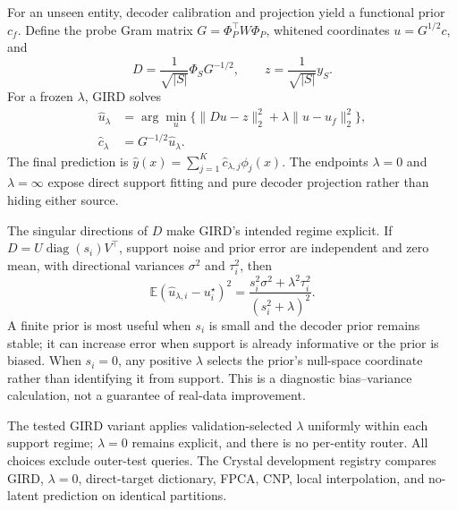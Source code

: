 For an unseen entity, decoder calibration and projection yield a functional
prior $c_f$.  Define the probe Gram matrix
$G=\Phi_P^\top W\Phi_P$, whitened coordinates $u=G^{1/2}c$, and
\begin{equation}
  D=\frac{1}{\sqrt{|S|}}\Phi_SG^{-1/2},\qquad
  z=\frac{1}{\sqrt{|S|}}y_S.
\end{equation}
For a frozen $\lambda$, GIRD solves
\begin{equation}
  \begin{aligned}
    \hat u_\lambda
    &=\arg\min_u
      \bigl\{\|Du-z\|_2^2
      +\lambda\|u-u_f\|_2^2\bigr\},\\
    \hat c_\lambda&=G^{-1/2}\hat u_\lambda.
  \end{aligned}
  \label{eq:gird}
\end{equation}
The final prediction is
$\hat y(x)=\sum_{j=1}^{K}\hat c_{\lambda,j}\phi_j(x)$.  The endpoints
$\lambda=0$ and $\lambda=\infty$ expose direct support fitting and pure decoder
projection rather than hiding either source.

The singular directions of $D$ make GIRD's intended regime explicit.  If
$D=U\operatorname{diag}(s_i)V^\top$, support noise and prior error are
independent and zero mean, with directional variances $\sigma^2$ and
$\tau_i^2$, then
\begin{equation}
  \mathbb{E}(\hat u_{\lambda,i}-u_i^\star)^2
  =\frac{s_i^2\sigma^2+\lambda^2\tau_i^2}
  {(s_i^2+\lambda)^2}.
  \label{eq:gird-risk}
\end{equation}
A finite prior is most useful when $s_i$ is small and the decoder prior remains
stable; it can increase error when support is already informative or the prior
is biased.  When $s_i=0$, any positive $\lambda$ selects the prior's null-space
coordinate rather than identifying it from support.  This is a diagnostic
bias--variance calculation, not a guarantee of real-data improvement.

The tested GIRD variant applies validation-selected $\lambda$ uniformly within
each support regime; $\lambda=0$ remains explicit, and there is no per-entity
router.  All choices exclude outer-test queries.  The Crystal development
registry compares GIRD, $\lambda=0$, direct-target dictionary, FPCA, CNP, local
interpolation, and no-latent prediction on identical partitions.


